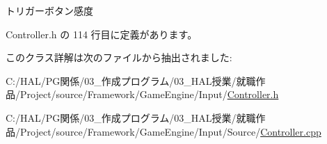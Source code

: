 トリガーボタン感度 



 Controller.\+h の 114 行目に定義があります。



このクラス詳解は次のファイルから抽出されました\+:\begin{DoxyCompactItemize}
\item 
C\+:/\+H\+A\+L/\+P\+G関係/03\+\_\+作成プログラム/03\+\_\+\+H\+A\+L授業/就職作品/\+Project/source/\+Framework/\+Game\+Engine/\+Input/\mbox{\hyperlink{_controller_8h}{Controller.\+h}}\item 
C\+:/\+H\+A\+L/\+P\+G関係/03\+\_\+作成プログラム/03\+\_\+\+H\+A\+L授業/就職作品/\+Project/source/\+Framework/\+Game\+Engine/\+Input/\+Source/\mbox{\hyperlink{_controller_8cpp}{Controller.\+cpp}}\end{DoxyCompactItemize}
